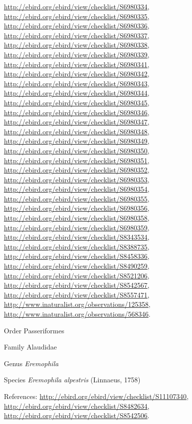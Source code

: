 \documentclass[9pt, article]{memoir}
\begin{document}
\begin{multicols}{2}
\url{http://ebird.org/ebird/view/checklist/S6980334}, 
\url{http://ebird.org/ebird/view/checklist/S6980335}, 
\url{http://ebird.org/ebird/view/checklist/S6980336}, 
\url{http://ebird.org/ebird/view/checklist/S6980337}, 
\url{http://ebird.org/ebird/view/checklist/S6980338}, 
\url{http://ebird.org/ebird/view/checklist/S6980339}, 
\url{http://ebird.org/ebird/view/checklist/S6980341}, 
\url{http://ebird.org/ebird/view/checklist/S6980342}, 
\url{http://ebird.org/ebird/view/checklist/S6980343}, 
\url{http://ebird.org/ebird/view/checklist/S6980344}, 
\url{http://ebird.org/ebird/view/checklist/S6980345}, 
\url{http://ebird.org/ebird/view/checklist/S6980346}, 
\url{http://ebird.org/ebird/view/checklist/S6980347}, 
\url{http://ebird.org/ebird/view/checklist/S6980348}, 
\url{http://ebird.org/ebird/view/checklist/S6980349}, 
\url{http://ebird.org/ebird/view/checklist/S6980350}, 
\url{http://ebird.org/ebird/view/checklist/S6980351}, 
\url{http://ebird.org/ebird/view/checklist/S6980352}, 
\url{http://ebird.org/ebird/view/checklist/S6980353}, 
\url{http://ebird.org/ebird/view/checklist/S6980354}, 
\url{http://ebird.org/ebird/view/checklist/S6980355}, 
\url{http://ebird.org/ebird/view/checklist/S6980356}, 
\url{http://ebird.org/ebird/view/checklist/S6980358}, 
\url{http://ebird.org/ebird/view/checklist/S6980359}, 
\url{http://ebird.org/ebird/view/checklist/S8343534}, 
\url{http://ebird.org/ebird/view/checklist/S8388735}, 
\url{http://ebird.org/ebird/view/checklist/S8458336}, 
\url{http://ebird.org/ebird/view/checklist/S8490259}, 
\url{http://ebird.org/ebird/view/checklist/S8521206}, 
\url{http://ebird.org/ebird/view/checklist/S8542567}, 
\url{http://ebird.org/ebird/view/checklist/S8557471}, 
\url{http://www.inaturalist.org/observations/125358}, 
\url{http://www.inaturalist.org/observations/568346}.

\vspace{6pt}\noindent\hspace{18pt}Order Passeriformes


\vspace{6pt}\noindent\hspace{24pt}Family Alaudidae


\vspace{6pt}\noindent\hspace{30pt}Genus \textit{Eremophila}


\vspace{6pt}\noindent\hspace{36pt}Species \textit{Eremophila alpestris} (Linnaeus, 1758)


\vspace{6pt}References: 
\url{http://ebird.org/ebird/view/checklist/S11107340}, 
\url{http://ebird.org/ebird/view/checklist/S8482634}, 
\url{http://ebird.org/ebird/view/checklist/S8542506}.


\end{multicols}
\end{document}

